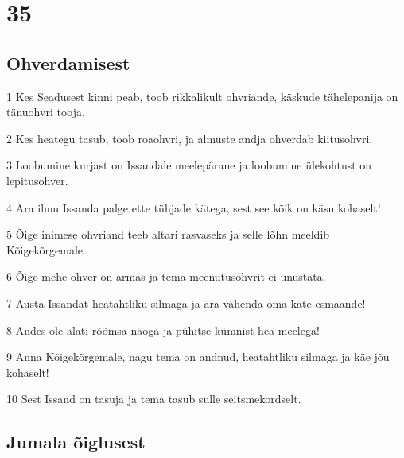 \chapter{35}

\section*{Ohverdamisest}

\par 1 Kes Seadusest kinni peab, toob rikkalikult ohvriande, käskude tähelepanija on tänuohvri tooja.
\par 2 Kes heategu tasub, toob roaohvri, ja almuste andja ohverdab kiitusohvri.
\par 3 Loobumine kurjast on Issandale meelepärane ja loobumine ülekohtust on lepitusohver.
\par 4 Ära ilmu Issanda palge ette tühjade kätega, sest see kõik on käsu kohaselt!
\par 5 Õige inimese ohvriand teeb altari rasvaseks ja selle lõhn meeldib Kõigekõrgemale.
\par 6 Õige mehe ohver on armas ja tema meenutusohvrit ei unustata.
\par 7 Austa Issandat heatahtliku silmaga ja ära vähenda oma käte esmaande!
\par 8 Andes ole alati rõõmsa näoga ja pühitse kümnist hea meelega!
\par 9 Anna Kõigekõrgemale, nagu tema on andnud, heatahtliku silmaga ja käe jõu kohaselt!
\par 10 Sest Issand on tasuja ja tema tasub sulle seitsmekordselt.

\section*{Jumala õiglusest}

